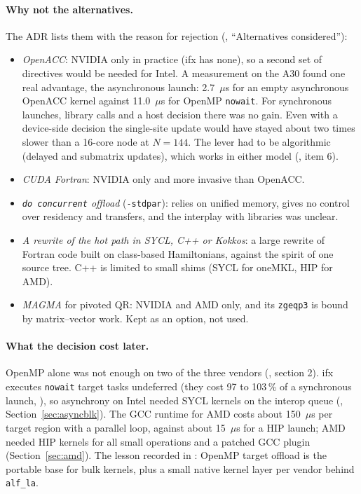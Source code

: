 \paragraph{Why not the alternatives.} The ADR lists them with the reason for rejection (, ``Alternatives considered''):
\begin{itemize}
\item \emph{OpenACC}: NVIDIA only in practice (ifx has none), so a second set of directives would be needed for Intel. A measurement on the A30 found one real advantage, the asynchronous launch: 2.7~$\mu$s for an empty asynchronous OpenACC kernel against 11.0~$\mu$s for OpenMP \texttt{nowait}. %
For synchronous launches, library calls and a host decision there was no gain. Even with a device-side decision the single-site update would have stayed about two times slower than a 16-core node at $N=144$. The lever had to be algorithmic (delayed and submatrix updates), which works in either model (, item 6).
\item \emph{CUDA Fortran}: NVIDIA only and more invasive than OpenACC.
\item \emph{\texttt{do concurrent} offload} (\texttt{-stdpar}): relies on unified memory, gives no control over residency and transfers, and the interplay with libraries was unclear.
\item \emph{A rewrite of the hot path in SYCL, C++ or Kokkos}: a large rewrite of Fortran code built on class-based Hamiltonians, against the spirit of one source tree. C++ is limited to small shims (SYCL for oneMKL, HIP for AMD).
\item \emph{MAGMA} for pivoted QR: NVIDIA and AMD only, and its \texttt{zgeqp3} is bound by matrix--vector work. Kept as an option, not used.
\end{itemize}

\paragraph{What the decision cost later.} OpenMP alone was not enough on two of the three vendors (, section 2). ifx executes \texttt{nowait} target tasks undeferred (they cost 97 to 103\,\% of a synchronous launch, ), so asynchrony on Intel needed SYCL kernels on the interop queue (, Section~\ref{sec:asyncblk}). %
The GCC runtime for AMD costs about 150~$\mu$s per target region with a parallel loop, against about 15~$\mu$s for a HIP launch; AMD needed HIP kernels for all small operations and a patched GCC plugin (Section~\ref{sec:amd}). %
The lesson recorded in : OpenMP target offload is the portable base for bulk kernels, plus a small native kernel layer per vendor behind \texttt{alf\_la}.

